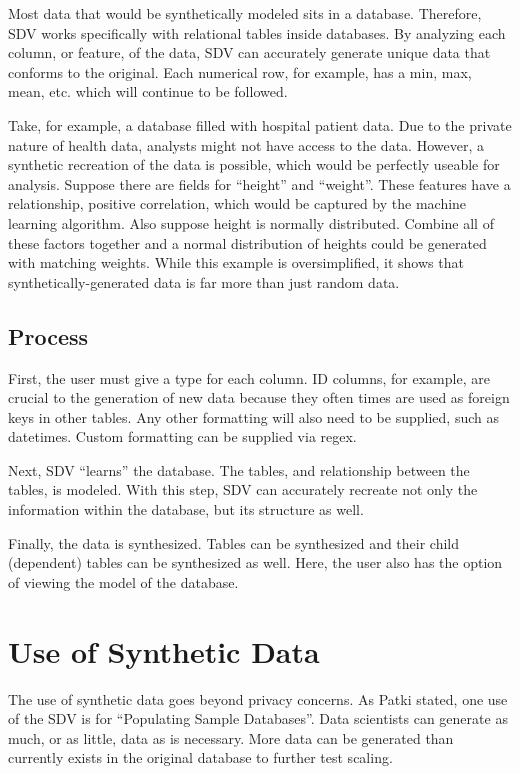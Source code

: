 Most data that would be synthetically modeled sits in a database. Therefore,
SDV works specifically with relational tables inside databases. By analyzing
each column, or feature, of the data, SDV can accurately generate unique data
that conforms to the original. Each numerical row, for example, has a min,
max, mean, etc. which will continue to be followed.

Take, for example, a database filled with hospital patient data. Due to
the private nature of health data, analysts might not have access to the
data. However, a synthetic recreation of the data is possible, which would be
perfectly useable for analysis. Suppose there are fields for ``height'' and
``weight''. These features have a relationship, positive correlation, which
would be captured by the machine learning algorithm. Also suppose height is
normally distributed. Combine all of these factors together and a normal
distribution of heights could be generated with matching weights. While
this example is oversimplified, it shows that synthetically-generated data
is far more than just random data.

\subsection{Process}

First, the user must give a type for each column. ID columns, for example,
are crucial to the generation of new data because they often times are used
as foreign keys in other tables. Any other formatting will also need to be
supplied, such as datetimes. Custom formatting can be supplied via regex.

Next, SDV ``learns'' the database. The tables, and relationship between the
tables, is modeled. With this step, SDV can accurately recreate not only
the information within the database, but its structure as well.

Finally, the data is synthesized. Tables can be synthesized and their child
(dependent) tables can be synthesized as well. Here, the user also has the
option of viewing the model of the database.


\section{Use of Synthetic Data}

The use of synthetic data goes beyond privacy concerns. As Patki stated,
one use of the SDV is for ``Populating Sample Databases''\cite{}. Data
scientists can generate as much, or as little, data as is necessary. More
data can be generated than currently exists in the original database to
further test scaling.

